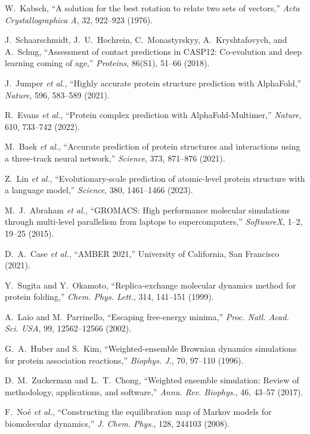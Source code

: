 \documentclass[12pt,a4paper]{article}
\begin{document}
\begin{thebibliography}{99}
W.~Kabsch, ``A solution for the best rotation to relate two sets of vectors,'' \emph{Acta Crystallographica A}, 32, 922–923 (1976).

J.~Schaarschmidt, J.~U.~Hochrein, C.~Monastyrskyy, A.~Kryshtafovych, and A.~Schug, ``Assessment of contact predictions in CASP12: Co-evolution and deep learning coming of age,'' \emph{Proteins}, 86(S1), 51–66 (2018).

J.~Jumper \emph{et al.}, ``Highly accurate protein structure prediction with AlphaFold,'' \emph{Nature}, 596, 583–589 (2021).

R.~Evans \emph{et al.}, ``Protein complex prediction with AlphaFold-Multimer,'' \emph{Nature}, 610, 733–742 (2022).

M.~Baek \emph{et al.}, ``Accurate prediction of protein structures and interactions using a three-track neural network,'' \emph{Science}, 373, 871–876 (2021).

Z.~Lin \emph{et al.}, ``Evolutionary-scale prediction of atomic-level protein structure with a language model,'' \emph{Science}, 380, 1461–1466 (2023).

M.~J.~Abraham \emph{et al.}, ``GROMACS: High performance molecular simulations through multi-level parallelism from laptops to supercomputers,'' \emph{SoftwareX}, 1–2, 19–25 (2015).

D.~A.~Case \emph{et al.}, ``AMBER 2021,'' University of California, San Francisco (2021).

Y.~Sugita and Y.~Okamoto, ``Replica-exchange molecular dynamics method for protein folding,'' \emph{Chem. Phys. Lett.}, 314, 141–151 (1999).

A.~Laio and M.~Parrinello, ``Escaping free-energy minima,'' \emph{Proc. Natl. Acad. Sci. USA}, 99, 12562–12566 (2002).

G.~A.~Huber and S.~Kim, ``Weighted-ensemble Brownian dynamics simulations for protein association reactions,'' \emph{Biophys. J.}, 70, 97–110 (1996).

D.~M.~Zuckerman and L.~T.~Chong, ``Weighted ensemble simulation: Review of methodology, applications, and software,'' \emph{Annu. Rev. Biophys.}, 46, 43–57 (2017).

F.~Noé \emph{et al.}, ``Constructing the equilibration map of Markov models for biomolecular dynamics,'' \emph{J. Chem. Phys.}, 128, 244103 (2008).


\end{thebibliography}
\end{document}

